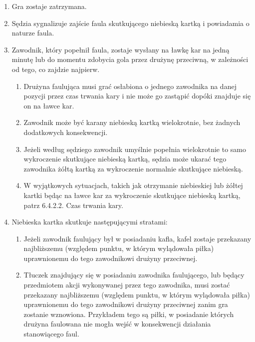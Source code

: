 \documentclass[12pt]{article}
\begin{document}
\begin{enumerate}
\item
    Gra zostaje zatrzymana.
  \item
    Sędzia sygnalizuje zajście faula skutkującego niebieską kartką i
  powiadamia o naturze faula.
  \item
    Zawodnik, który popełnił faula, zostaje wysłany na ławkę kar na jedną
  minutę lub do momentu zdobycia gola przez drużynę przeciwną, w
  zależności od tego, co zajdzie najpierw.
  
  \begin{enumerate}
  \item
        Drużyna faulująca musi grać osłabiona o jednego zawodnika na danej
    pozycji przez czas trwania kary i nie może go zastąpić dopóki
    znajduje się on na ławce kar.
      \item
        Zawodnik może być karany niebieską kartką wielokrotnie, bez żadnych
    dodatkowych konsekwencji.
      \item
        Jeżeli według sędziego zawodnik umyślnie popełnia wielokrotnie to
    samo wykroczenie skutkujące niebieską kartką, sędzia może ukarać
    tego zawodnika żółtą kartką za wykroczenie normalnie skutkujące
    niebieską.
      \item
        W wyjątkowych sytuacjach, takich jak otrzymanie niebieskiej lub
    żółtej kartki będąc na ławce kar za wykroczenie skutkujące niebieską
    kartką, patrz 6.4.2.2. Czas trwania kary.
      \end{enumerate}
\item
    Niebieska kartka skutkuje następującymi stratami:
  
  \begin{enumerate}
  \item
        Jeżeli zawodnik faulujący był w posiadaniu kafla, kafel zostaje
    przekazany najbliższemu (względem punktu, w którym wylądowała piłka)
    uprawnionemu do tego zawodnikowi drużyny przeciwnej.
      \item
        Tłuczek znajdujący się w posiadaniu zawodnika faulującego, lub
    będący przedmiotem akcji wykonywanej przez tego zawodnika, musi
    zostać przekazany najbliższemu (względem punktu, w którym wylądowała
    piłka) uprawnionemu do tego zawodnikowi drużyny przeciwnej zanim gra
    zostanie wznowiona. Przykładem tego są piłki, w posiadanie których
    drużyna faulowana nie mogła wejść w konsekwencji działania
    stanowiącego faul.
    

\end{enumerate}
\end{enumerate}
\end{document}
